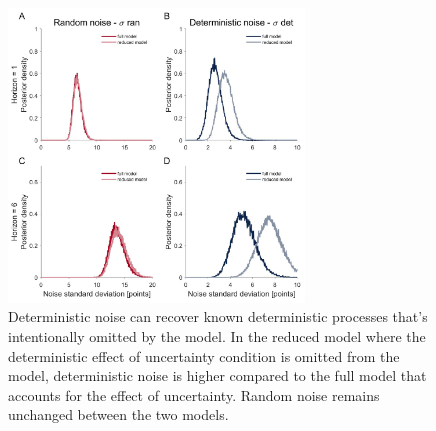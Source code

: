 \documentclass[12pt]{article}
\begin{document}
	\begin{figure}[H]
		\begin{center}
			\includegraphics[width=0.7\textwidth]{figures/RDBayes_reduced_model.jpg}
			\caption{Deterministic noise can recover known deterministic processes that's intentionally omitted by the model. In the reduced model where the deterministic effect of uncertainty condition is omitted from the model, deterministic noise is higher compared to the full model that accounts for the effect of uncertainty. Random noise remains unchanged between the two models.}
			\label{fig:reducedmodel}
		\end{center}
	\end{figure} 
	
\end{document}
